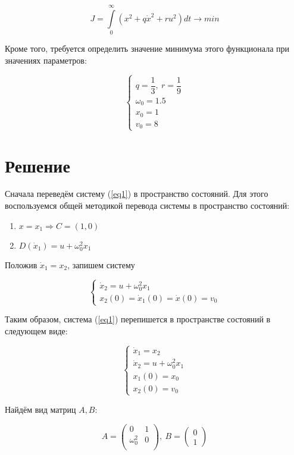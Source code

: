 \documentclass[12pt]{article}
\begin{document}
\begin{equation}
 J = \int\limits_{0}^{\infty}(x^2 + q\dot x^2 + ru^2)dt \rightarrow min
\end{equation}

Кроме того, требуется определить значение минимума этого функционала при значениях параметров:

$$
 \begin{cases}
  q = \dfrac{1}{3} ,\ r = \dfrac{1}{9} \\
  \omega_0 = 1.5 \\
  x_0 = 1 \\
  v_0 = 8
 \end{cases}
$$



\section{Решение}

Сначала переведём систему (\ref{eq1}) в пространство состояний. Для этого воспользуемся общей методикой перевода системы в пространство состояний:

\begin{enumerate}
 \item $ x = x_1 \Rightarrow C = (1, 0)$
 \item $ D(\dot x_1) = u + \omega_0^2x_1$
\end{enumerate}
Положив $\dot x_1 = x_2$, запишем систему

$$
 \begin{cases}
  \dot x_2 = u + \omega_0^2x_1 \\
  x_2(0) = \dot x_1(0) = \dot x(0) = v_0 
 \end{cases} 
$$

Таким образом, система (\ref{eq1}) перепишется в пространстве состояний в следующем виде:

\begin{equation}\label{eq3}
 \begin{cases}
  \dot x_1 = x_2 \\
  \dot x_2 = u + \omega_0^2x_1 \\
  x_1(0) = x_0 \\
  x_2(0) = v_0
 \end{cases}
\end{equation}

\pagebreak
Найдём вид матриц $A, B$:

\begin{equation}
 A = 
 \begin{pmatrix}
  0 & 1\\
  \omega_0^2 & 0 \\
 \end{pmatrix}
 , \ B = 
 \begin{pmatrix}
  0 \\
  1
 \end{pmatrix}
\end{equation}
\end{document}
